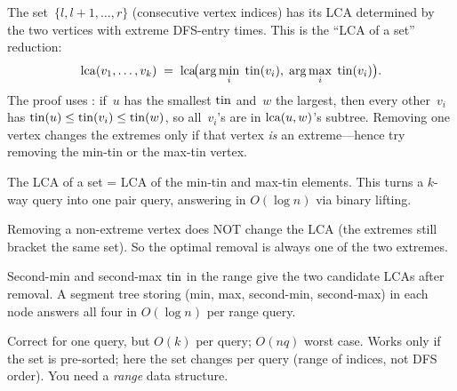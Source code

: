 The set~\(\{l, l{+}1, \ldots, r\}\) (consecutive vertex indices) has
its LCA determined by the two vertices with extreme DFS-entry times.
This is the ``LCA of a set'' reduction:
\[
  \operatorname{lca}(v_1, \ldots, v_k)
  \;=\; \operatorname{lca}\!\bigl(\arg\min_i\;\operatorname{tin}(v_i),\;
                     \arg\max_i\;\operatorname{tin}(v_i)\bigr).
\]
The proof uses : if~\(u\) has the smallest
\(\operatorname{tin}\) and~\(w\) the largest, then every other~\(v_i\) has
\(\operatorname{tin}(u) \le \operatorname{tin}(v_i) \le \operatorname{tin}(w)\), so all~\(v_i\)'s are in
\(\operatorname{lca}(u,w)\)'s subtree. Removing one vertex changes the extremes only
if that vertex \emph{is} an extreme---hence try removing the min-tin
or the max-tin vertex.

\begin{observation}
The LCA of a set = LCA of the min-tin and max-tin elements. This
turns a \(k\)-way query into one pair query, answering in \(O(\log n)\)
via binary lifting.
\end{observation}
\begin{observation}
Removing a non-extreme vertex does NOT change the LCA (the extremes
still bracket the same set). So the optimal removal is always one of
the two extremes.
\end{observation}
\begin{observation}
Second-min and second-max \(\operatorname{tin}\) in the range give the two candidate
LCAs after removal. A segment tree storing (min, max, second-min,
second-max) in each node answers all four in \(O(\log n)\) per range
query.
\end{observation}

\begin{thinkbox}
{Correct for one query, but \(O(k)\) per query; \(O(nq)\) worst case.}
{Works only if the set is pre-sorted; here the set changes per query
(range of indices, not DFS order). You need a \emph{range} data
structure.}
\end{thinkbox}


